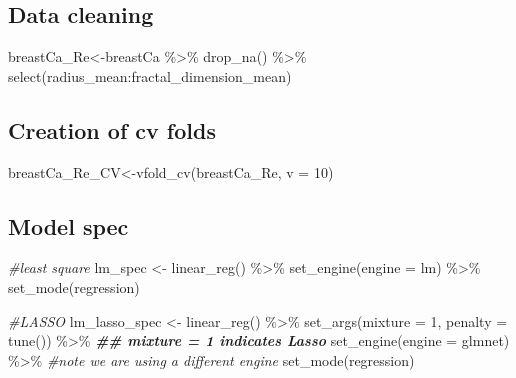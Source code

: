 \documentclass[
]{article}
\newenvironment{Shaded}{\begin{snugshade}}{\end{snugshade}}
\newcommand{\AttributeTok}[1]{\textcolor[rgb]{0.77,0.63,0.00}{#1}}
\newcommand{\CommentTok}[1]{\textcolor[rgb]{0.56,0.35,0.01}{\textit{#1}}}
\newcommand{\DecValTok}[1]{\textcolor[rgb]{0.00,0.00,0.81}{#1}}
\newcommand{\DocumentationTok}[1]{\textcolor[rgb]{0.56,0.35,0.01}{\textbf{\textit{#1}}}}
\newcommand{\FunctionTok}[1]{\textcolor[rgb]{0.00,0.00,0.00}{#1}}
\newcommand{\NormalTok}[1]{#1}
\newcommand{\OtherTok}[1]{\textcolor[rgb]{0.56,0.35,0.01}{#1}}
\newcommand{\SpecialCharTok}[1]{\textcolor[rgb]{0.00,0.00,0.00}{#1}}
\newcommand{\StringTok}[1]{\textcolor[rgb]{0.31,0.60,0.02}{#1}}
\begin{document}
\hypertarget{data-cleaning}{%
\subsection{Data cleaning}\label{data-cleaning}}

\begin{Shaded}
\begin{Highlighting}[]
\NormalTok{breastCa\_Re}\OtherTok{\textless{}{-}}\NormalTok{breastCa }\SpecialCharTok{\%\textgreater{}\%} 
  \FunctionTok{drop\_na}\NormalTok{() }\SpecialCharTok{\%\textgreater{}\%} 
  \FunctionTok{select}\NormalTok{(radius\_mean}\SpecialCharTok{:}\NormalTok{fractal\_dimension\_mean) }
\end{Highlighting}
\end{Shaded}

\hypertarget{creation-of-cv-folds}{%
\subsection{Creation of cv folds}\label{creation-of-cv-folds}}

\begin{Shaded}
\begin{Highlighting}[]
\NormalTok{breastCa\_Re\_CV}\OtherTok{\textless{}{-}}\FunctionTok{vfold\_cv}\NormalTok{(breastCa\_Re, }\AttributeTok{v =} \DecValTok{10}\NormalTok{)}
\end{Highlighting}
\end{Shaded}

\hypertarget{model-spec}{%
\subsection{Model spec}\label{model-spec}}

\begin{Shaded}
\begin{Highlighting}[]
\CommentTok{\#least square}
\NormalTok{lm\_spec }\OtherTok{\textless{}{-}}
    \FunctionTok{linear\_reg}\NormalTok{() }\SpecialCharTok{\%\textgreater{}\%} 
    \FunctionTok{set\_engine}\NormalTok{(}\AttributeTok{engine =} \StringTok{\textquotesingle{}lm\textquotesingle{}}\NormalTok{) }\SpecialCharTok{\%\textgreater{}\%} 
    \FunctionTok{set\_mode}\NormalTok{(}\StringTok{\textquotesingle{}regression\textquotesingle{}}\NormalTok{)}

\CommentTok{\#LASSO}
\NormalTok{lm\_lasso\_spec }\OtherTok{\textless{}{-}} 
  \FunctionTok{linear\_reg}\NormalTok{() }\SpecialCharTok{\%\textgreater{}\%}
  \FunctionTok{set\_args}\NormalTok{(}\AttributeTok{mixture =} \DecValTok{1}\NormalTok{, }\AttributeTok{penalty =} \FunctionTok{tune}\NormalTok{()) }\SpecialCharTok{\%\textgreater{}\%} \DocumentationTok{\#\# mixture = 1 indicates Lasso}
  \FunctionTok{set\_engine}\NormalTok{(}\AttributeTok{engine =} \StringTok{\textquotesingle{}glmnet\textquotesingle{}}\NormalTok{) }\SpecialCharTok{\%\textgreater{}\%} \CommentTok{\#note we are using a different engine}
  \FunctionTok{set\_mode}\NormalTok{(}\StringTok{\textquotesingle{}regression\textquotesingle{}}\NormalTok{)}
\end{Highlighting}
\end{Shaded}
\end{document}
